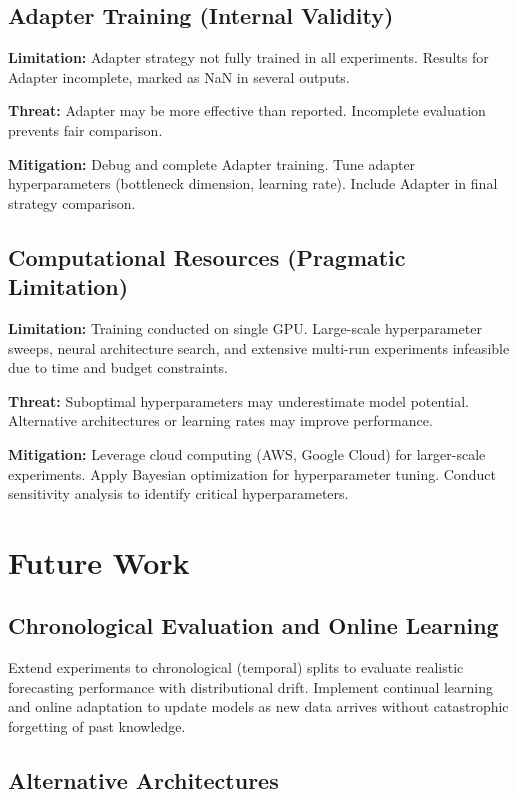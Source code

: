 \documentclass[12pt,a4paper]{report}
\begin{document}
\subsection{Adapter Training (Internal Validity)}

\textbf{Limitation:} Adapter strategy not fully trained in all experiments. Results for Adapter incomplete, marked as NaN in several outputs.

\textbf{Threat:} Adapter may be more effective than reported. Incomplete evaluation prevents fair comparison.

\textbf{Mitigation:} Debug and complete Adapter training. Tune adapter hyperparameters (bottleneck dimension, learning rate). Include Adapter in final strategy comparison.

\subsection{Computational Resources (Pragmatic Limitation)}

\textbf{Limitation:} Training conducted on single GPU. Large-scale hyperparameter sweeps, neural architecture search, and extensive multi-run experiments infeasible due to time and budget constraints.

\textbf{Threat:} Suboptimal hyperparameters may underestimate model potential. Alternative architectures or learning rates may improve performance.

\textbf{Mitigation:} Leverage cloud computing (AWS, Google Cloud) for larger-scale experiments. Apply Bayesian optimization for hyperparameter tuning. Conduct sensitivity analysis to identify critical hyperparameters.

\section{Future Work}

\subsection{Chronological Evaluation and Online Learning}

Extend experiments to chronological (temporal) splits to evaluate realistic forecasting performance with distributional drift. Implement continual learning and online adaptation to update models as new data arrives without catastrophic forgetting of past knowledge.

\subsection{Alternative Architectures}
\end{document}
